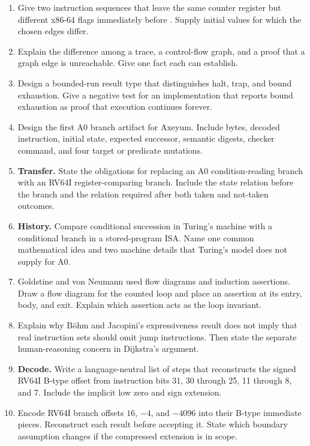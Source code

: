 \begin{enumerate}
\item Give two instruction sequences that leave the same counter register but
different x86-64 flags immediately before . Supply initial values
for which the chosen edges differ.

\item Explain the difference among a trace, a control-flow graph, and a proof
that a graph edge is unreachable. Give one fact each can establish.

\item Design a bounded-run result type that distinguishes halt, trap, and
bound exhaustion. Give a negative test for an implementation that reports
bound exhaustion as proof that execution continues forever.

\item Design the first A0 branch artifact for Axeyum. Include bytes, decoded
instruction, initial state, expected successor, semantic digests, checker
command, and four target or predicate mutations.

\item \textbf{Transfer.} State the obligations for replacing an A0
condition-reading branch with an RV64I register-comparing branch. Include the
state relation before the branch and the relation required after both taken
and not-taken outcomes.
\item \textbf{History.} Compare conditional succession in Turing's machine
with a conditional branch in a stored-program ISA. Name one common
mathematical idea and two machine details that Turing's model does not supply
for A0.

\item Goldstine and von Neumann used flow diagrams and induction assertions.
Draw a flow diagram for the counted loop and place an assertion at its entry,
body, and exit. Explain which assertion acts as the loop invariant.

\item Explain why Böhm and Jacopini's expressiveness result does not imply that
real instruction sets should omit jump instructions. Then state the separate
human-reasoning concern in Dijkstra's argument.

\item \textbf{Decode.} Write a language-neutral list of steps that reconstructs
the signed RV64I
B-type offset from instruction bits 31, 30 through 25, 11 through 8, and 7.
Include the implicit low zero and sign extension.

\item Encode RV64I branch offsets \(16\), \(-4\), and \(-4096\) into their
B-type immediate pieces. Reconstruct each result before accepting it. State
which boundary assumption changes if the compressed extension is in scope.


\end{enumerate}
